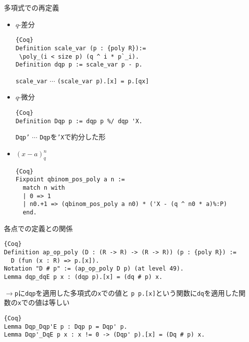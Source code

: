 \documentclass[unicode,mathserif]{beamer}
\begin{document}
\begin{frame}[fragile]
\begin{columns}[T]
	\begin{column}{0.33\columnwidth}
		\begin{block}{多項式での再定義}
			\begin{itemize}
			\item $q$-差分
			\begin{lstlisting}{Coq}
Definition scale_var (p : {poly R}):=
 \poly_(i < size p) (q ^ i * p`_i).
Definition dqp p := scale_var p - p. \end{lstlisting}
		{\tt scale\_var} $\cdots$ {\tt (scale\_var p).[x] = p.[qx]}
			\item $q$-微分
			\begin{lstlisting}{Coq}
Definition Dqp p := dqp p %/ dqp 'X.
\end{lstlisting}
		{\tt Dqp'} $\cdots$ {\tt Dqp}を{\tt 'X}で約分した形
			\item $(x - a)^n_q$
			\begin{lstlisting}{Coq}
Fixpoint qbinom_pos_poly a n :=
  match n with
  | 0 => 1
  | n0.+1 => (qbinom_pos_poly a n0) * ('X - (q ^ n0 * a)%:P)
  end. \end{lstlisting}
  			\end{itemize}
		\end{block}
%		
%			
%
%

		\begin{block}{各点での定義との関係}
				\begin{lstlisting}{Coq}
Definition ap_op_poly (D : (R -> R) -> (R -> R)) (p : {poly R}) :=
  D (fun (x : R) => p.[x]).
Notation "D # p" := (ap_op_poly D p) (at level 49).
Lemma dqp_dqE p x : (dqp p).[x] = (dq # p) x. \end{lstlisting}
				$\to${\tt p}に{\tt dqp}を適用した多項式の{\tt x}での値と
				{\tt p \mapsto p.[x]}という関数に{\tt dq}を適用した関数の{\tt x}での値は等しい
				\begin{lstlisting}{Coq}
Lemma Dqp_Dqp'E p : Dqp p = Dqp' p.
Lemma Dqp'_DqE p x : x != 0 -> (Dqp' p).[x] = (Dq # p) x. 


\end{lstlisting}
\end{block}
\end{column}
\end{columns}
\end{frame}
\end{document}

